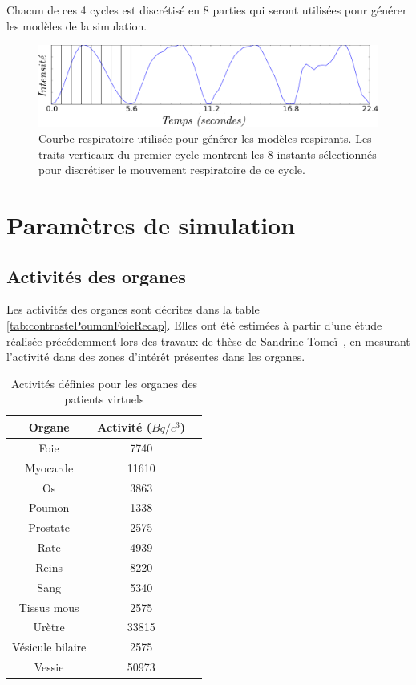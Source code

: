 Chacun de ces 4 cycles est discrétisé en 8 parties qui seront utilisées pour générer les modèles de la simulation. 


\begin{figure}
 \centering
 \includegraphics[width=12cm]{images/courbesRespi}

 \caption[signal respiratoire utilisé pour les modèles de la base de données]{Courbe respiratoire utilisée pour générer les modèles respirants. Les traits verticaux du premier cycle montrent les 8 instants sélectionnés pour discrétiser le mouvement respiratoire de ce cycle.}
 \label{fig:cycleRespi}
\end{figure}

	\section{Paramètres de simulation}

\subsection{Activités des organes}

Les activités des organes sont décrites dans la table \ref{tab:contrastePoumonFoieRecap}. Elles ont été estimées à partir d'une étude réalisée précédemment lors des travaux de thèse de Sandrine Tomeï~\cite{tomei2008development}, en mesurant l'activité dans des zones d'intérêt présentes dans les organes.

\begin{table}
\centering
 \begin{tabular}{|c|c|c|} 
\hline
Organe 		& Activité ($Bq/c^3$) \\
\hline
\hline
Foie		& 7740		       \\
\hline
Myocarde	& 11610		       \\
\hline
Os		& 3863		       \\
\hline
Poumon 		& 1338 		       \\
\hline
Prostate	& 2575		       \\
\hline
Rate		& 4939		       \\
\hline
Reins		& 8220		       \\
\hline
Sang		& 5340		       \\
\hline
Tissus mous 	& 2575 		       \\
\hline
Urètre		& 33815		       \\
\hline
Vésicule bilaire& 2575		       \\
\hline
Vessie		& 50973		       \\
\hline
 \end{tabular}

\caption[Activités des organes des patients de la base de données]{Activités définies pour les organes des patients virtuels}
\label{tab:activiteOrganes}
\end{table}

